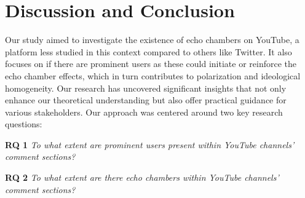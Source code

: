 \documentclass[
  man,floatsintext]{apa6}
\begin{document}
\section{Discussion and Conclusion}\label{discussion-and-conclusion}

Our study aimed to investigate the existence of echo chambers on YouTube, a platform less studied in this context compared to others like Twitter. It also focuses on if there are prominent users as these could initiate or reinforce the echo chamber effects, which in turn contributes to polarization and ideological homogeneity. Our research has uncovered significant insights that not only enhance our theoretical understanding but also offer practical guidance for various stakeholders. Our approach was centered around two key research questions:

\textbf{RQ 1}
\emph{To what extent are prominent users present within YouTube channels' comment sections?}

\textbf{RQ 2}
\emph{To what extent are there echo chambers within YouTube channels' comment sections?}
\end{document}
